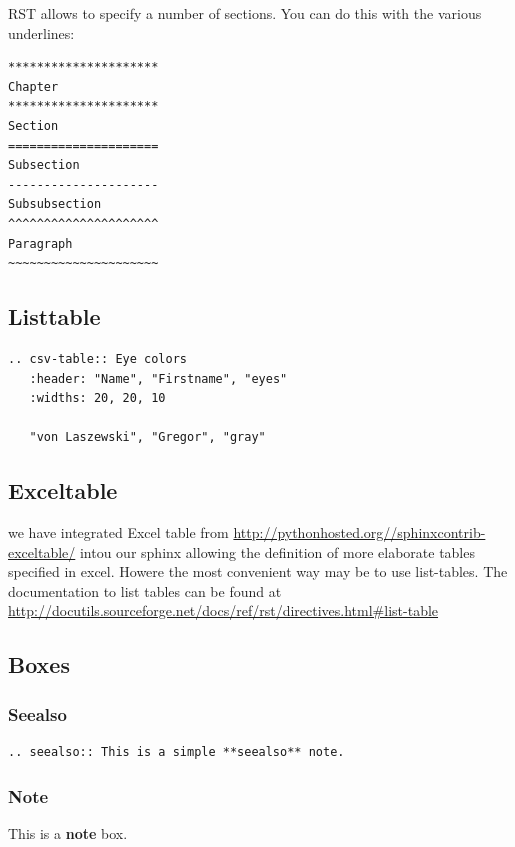 RST allows to specify a number of sections. You can do this with the
various underlines:

\begin{verbatim}
*********************
Chapter
*********************
Section
=====================
Subsection
---------------------
Subsubsection
^^^^^^^^^^^^^^^^^^^^^
Paragraph
~~~~~~~~~~~~~~~~~~~~~
\end{verbatim}

\subsection{Listtable}\label{listtable}

\begin{verbatim}
.. csv-table:: Eye colors
   :header: "Name", "Firstname", "eyes"
   :widths: 20, 20, 10

   "von Laszewski", "Gregor", "gray"
\end{verbatim}

\subsection{Exceltable}\label{exceltable}

we have integrated Excel table from
\url{http://pythonhosted.org//sphinxcontrib-exceltable/} intou our
sphinx allowing the definition of more elaborate tables specified in
excel. Howere the most convenient way may be to use list-tables. The
documentation to list tables can be found at
\url{http://docutils.sourceforge.net/docs/ref/rst/directives.html\#list-table}

\subsection{Boxes}\label{boxes}

\subsubsection{Seealso}\label{seealso}

\begin{verbatim}
.. seealso:: This is a simple **seealso** note. 
\end{verbatim}

\subsubsection{Note}\label{note}

This is a \textbf{note} box.


